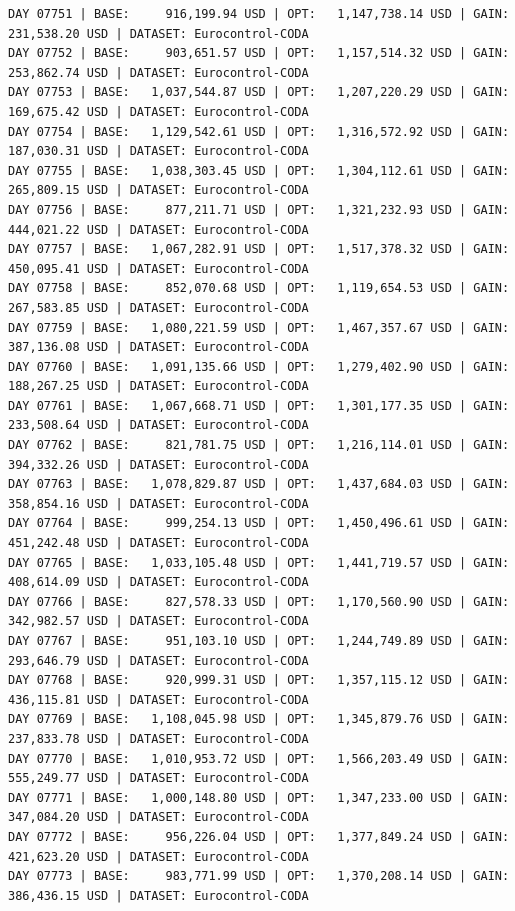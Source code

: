\documentclass[11pt,a4paper]{article}
\begin{document}
\begin{verbatim}
DAY 07751 | BASE:     916,199.94 USD | OPT:   1,147,738.14 USD | GAIN: 231,538.20 USD | DATASET: Eurocontrol-CODA
DAY 07752 | BASE:     903,651.57 USD | OPT:   1,157,514.32 USD | GAIN: 253,862.74 USD | DATASET: Eurocontrol-CODA
DAY 07753 | BASE:   1,037,544.87 USD | OPT:   1,207,220.29 USD | GAIN: 169,675.42 USD | DATASET: Eurocontrol-CODA
DAY 07754 | BASE:   1,129,542.61 USD | OPT:   1,316,572.92 USD | GAIN: 187,030.31 USD | DATASET: Eurocontrol-CODA
DAY 07755 | BASE:   1,038,303.45 USD | OPT:   1,304,112.61 USD | GAIN: 265,809.15 USD | DATASET: Eurocontrol-CODA
DAY 07756 | BASE:     877,211.71 USD | OPT:   1,321,232.93 USD | GAIN: 444,021.22 USD | DATASET: Eurocontrol-CODA
DAY 07757 | BASE:   1,067,282.91 USD | OPT:   1,517,378.32 USD | GAIN: 450,095.41 USD | DATASET: Eurocontrol-CODA
DAY 07758 | BASE:     852,070.68 USD | OPT:   1,119,654.53 USD | GAIN: 267,583.85 USD | DATASET: Eurocontrol-CODA
DAY 07759 | BASE:   1,080,221.59 USD | OPT:   1,467,357.67 USD | GAIN: 387,136.08 USD | DATASET: Eurocontrol-CODA
DAY 07760 | BASE:   1,091,135.66 USD | OPT:   1,279,402.90 USD | GAIN: 188,267.25 USD | DATASET: Eurocontrol-CODA
DAY 07761 | BASE:   1,067,668.71 USD | OPT:   1,301,177.35 USD | GAIN: 233,508.64 USD | DATASET: Eurocontrol-CODA
DAY 07762 | BASE:     821,781.75 USD | OPT:   1,216,114.01 USD | GAIN: 394,332.26 USD | DATASET: Eurocontrol-CODA
DAY 07763 | BASE:   1,078,829.87 USD | OPT:   1,437,684.03 USD | GAIN: 358,854.16 USD | DATASET: Eurocontrol-CODA
DAY 07764 | BASE:     999,254.13 USD | OPT:   1,450,496.61 USD | GAIN: 451,242.48 USD | DATASET: Eurocontrol-CODA
DAY 07765 | BASE:   1,033,105.48 USD | OPT:   1,441,719.57 USD | GAIN: 408,614.09 USD | DATASET: Eurocontrol-CODA
DAY 07766 | BASE:     827,578.33 USD | OPT:   1,170,560.90 USD | GAIN: 342,982.57 USD | DATASET: Eurocontrol-CODA
DAY 07767 | BASE:     951,103.10 USD | OPT:   1,244,749.89 USD | GAIN: 293,646.79 USD | DATASET: Eurocontrol-CODA
DAY 07768 | BASE:     920,999.31 USD | OPT:   1,357,115.12 USD | GAIN: 436,115.81 USD | DATASET: Eurocontrol-CODA
DAY 07769 | BASE:   1,108,045.98 USD | OPT:   1,345,879.76 USD | GAIN: 237,833.78 USD | DATASET: Eurocontrol-CODA
DAY 07770 | BASE:   1,010,953.72 USD | OPT:   1,566,203.49 USD | GAIN: 555,249.77 USD | DATASET: Eurocontrol-CODA
DAY 07771 | BASE:   1,000,148.80 USD | OPT:   1,347,233.00 USD | GAIN: 347,084.20 USD | DATASET: Eurocontrol-CODA
DAY 07772 | BASE:     956,226.04 USD | OPT:   1,377,849.24 USD | GAIN: 421,623.20 USD | DATASET: Eurocontrol-CODA
DAY 07773 | BASE:     983,771.99 USD | OPT:   1,370,208.14 USD | GAIN: 386,436.15 USD | DATASET: Eurocontrol-CODA

\end{verbatim}
\end{document}
